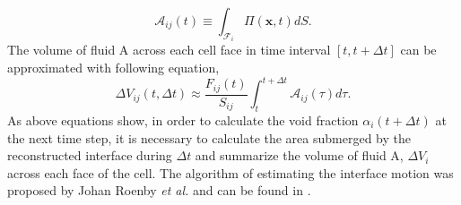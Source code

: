 \begin{equation}\label{25}
  \mathscr{A}_{ij}(t)\equiv\int_{\mathscr{F}_i}{\Pi(\mathbf{x},t)}dS.
\end{equation}
The volume of fluid A across each cell face in time interval $[t,t+\Delta{t}]$ can be approximated with following equation,
\begin{equation}\label{26}
  \Delta{V}_{ij}(t,\Delta{t})\approx\frac{F_{ij}(t)}{S_{ij}}\int_t^{t+\Delta{t}}\mathscr{A}_{ij}(\tau)d\tau.
\end{equation}
As above equations show, in order to calculate the void fraction $\alpha_{i}(t+\Delta{t})$ at the next time step, it is necessary to calculate the area submerged by the reconstructed interface during $\Delta{t}$ and summarize the volume of fluid A, $\Delta{V}_i$ across each face of the cell. The algorithm of estimating the interface motion was proposed by Johan Roenby \textit{et al.} and can be found in \cite{roenby2016computational}.

